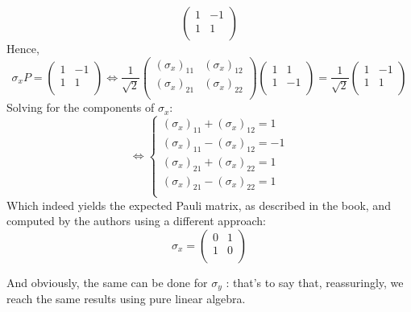 \documentclass[solutions.tex]{subfiles}
\begin{document}
\begin{remark}
\[\begin{pmatrix}
		1 & -1 \\
		1 & 1 \\
	\end{pmatrix}
\]
Hence,
\[
	\sigma_x P = \begin{pmatrix}
		1 & -1 \\
		1 & 1 \\
	\end{pmatrix} \Leftrightarrow
	\frac1{\sqrt2}\begin{pmatrix}
		(\sigma_x)_{11} & (\sigma_x)_{12} \\
		(\sigma_x)_{21} & (\sigma_x)_{22} \\
	\end{pmatrix}\begin{pmatrix}
		1 & 1 \\
		1 & -1 \\
	\end{pmatrix} = \frac1{\sqrt2}\begin{pmatrix}
		1 & -1 \\
		1 & 1 \\
	\end{pmatrix}
\]
Solving for the components of $\sigma_x$:
\[
	\Leftrightarrow \begin{cases}
		(\sigma_x)_{11}+(\sigma_x)_{12} = 1 \\
		(\sigma_x)_{11}-(\sigma_x)_{12} = -1 \\
		(\sigma_x)_{21}+(\sigma_x)_{22} = 1 \\
		(\sigma_x)_{21}-(\sigma_x)_{22} = 1 \\
	\end{cases}
\]
Which indeed yields the expected Pauli matrix, as
described in the book, and computed by the authors
using a different approach:
\[
	\boxed{\sigma_x = \begin{pmatrix}
		0 & 1 \\
		1 & 0 \\
	\end{pmatrix}}
\]

And obviously, the same can be done for $\sigma_y$ : that's
to say that, reassuringly, we reach the same results using
pure linear algebra.
\end{remark}
\end{document}
